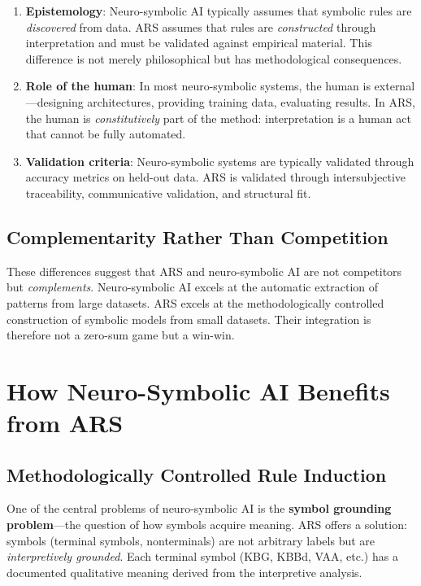 \documentclass[12pt,a4paper]{article}
\begin{document}
\begin{enumerate}
    \item \textbf{Epistemology}: Neuro-symbolic AI typically assumes that symbolic 
    rules are \textit{discovered} from data. ARS assumes that rules are 
    \textit{constructed} through interpretation and must be validated against 
    empirical material. This difference is not merely philosophical but has 
    methodological consequences.
    
    \item \textbf{Role of the human}: In most neuro-symbolic systems, the human 
    is external—designing architectures, providing training data, evaluating 
    results. In ARS, the human is \textit{constitutively} part of the method: 
    interpretation is a human act that cannot be fully automated.
    
    \item \textbf{Validation criteria}: Neuro-symbolic systems are typically 
    validated through accuracy metrics on held-out data. ARS is validated through 
    intersubjective traceability, communicative validation, and structural fit.
\end{enumerate}

\subsection{Complementarity Rather Than Competition}

These differences suggest that ARS and neuro-symbolic AI are not competitors 
but \textit{complements}. Neuro-symbolic AI excels at the automatic extraction 
of patterns from large datasets. ARS excels at the methodologically controlled 
construction of symbolic models from small datasets. Their integration is 
therefore not a zero-sum game but a win-win.

\section{How Neuro-Symbolic AI Benefits from ARS}

\subsection{Methodologically Controlled Rule Induction}

One of the central problems of neuro-symbolic AI is the \textbf{symbol grounding 
problem}—the question of how symbols acquire meaning. ARS offers a solution: 
symbols (terminal symbols, nonterminals) are not arbitrary labels but are 
\textit{interpretively grounded}. Each terminal symbol (KBG, KBBd, VAA, etc.) 
has a documented qualitative meaning derived from the interpretive analysis.
\end{document}
